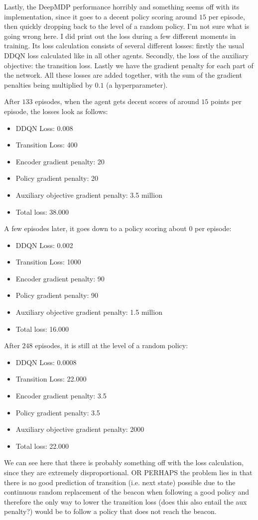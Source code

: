 Lastly, the DeepMDP performance horribly and something seems off with its implementation, since it goes to a decent policy scoring around $15$ per episode, then quickly dropping back to the level of a random policy. I'm not sure what is going wrong here. I did print out the loss during a few different moments in training. Its loss calculation consists of several different losses: firstly the usual DDQN loss calculated like in all other agents. Secondly, the loss of the auxiliary objective: the transition loss. Lastly we have the gradient penalty for each part of the network. All these losses are added together, with the sum of the gradient penalties being multiplied by $0.1$ (a hyperparameter).

After $133$ episodes, when the agent gets decent scores of around $15$ points per episode, the losses look as follows:
\begin{itemize}
\item DDQN Loss: 0.008
\item Transition Loss: 400
\item Encoder gradient penalty: 20
\item Policy gradient penalty: 20
\item Auxiliary objective gradient penalty: 3.5 million
\item Total loss: 38.000
\end{itemize}

A few episodes later, it goes down to a policy scoring about $0$ per episode:
\begin{itemize}
\item DDQN Loss: 0.002
\item Transition Loss: 1000
\item Encoder gradient penalty: 90
\item Policy gradient penalty: 90
\item Auxiliary objective gradient penalty: 1.5 million
\item Total loss: 16.000
\end{itemize}

After $248$ episodes, it is still at the level of a random policy:
\begin{itemize}
\item DDQN Loss: 0.0008 
\item Transition Loss: 22.000
\item Encoder gradient penalty: 3.5
\item Policy gradient penalty: 3.5
\item Auxiliary objective gradient penalty: 2000
\item Total loss: 22.000
\end{itemize}

We can see here that there is probably something off with the loss calculation, since they are extremely disproportional.
OR PERHAPS the problem lies in that there is no good prediction of transition (i.e. next state) possible due to the continuous random replacement of the beacon when following a good policy and therefore the only way to lower the transition loss (does this also entail the aux penalty?) would be to follow a policy that does not reach the beacon.